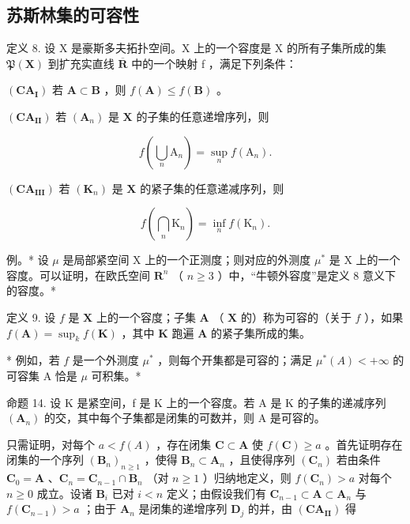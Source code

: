 \subsection{苏斯林集的可容性}

定义 8. 设 X 是豪斯多夫拓扑空间。X 上的一个容度是 X 的所有子集所成的集 \(\mathfrak{P}(\mathbf{X})\) 到扩充实直线 \(\overline{\mathbf{R}}\) 中的一个映射 f ，满足下列条件：

\((\mathbf{CA}_{\mathbf{I}})\) 若 \(\mathbf{A} \subset \mathbf{B}\) ，则 \(f(\mathbf{A}) \leqslant f(\mathbf{B})\) 。

\((\mathbf{CA}_{\mathbf{II}})\) 若 \((\mathbf{A}_n)\) 是 \(\mathbf{X}\) 的子集的任意递增序列，则

\[
f \left(\bigcup_ {n} \mathrm{A} _ {n}\right) = \sup _ {n} f (\mathrm{A} _ {n}).
\]

\((\mathbf{CA}_{\mathbf{III}})\) 若 \((\mathbf{K}_n)\) 是 \(\mathbf{X}\) 的紧子集的任意递减序列，则

\[
f \left(\bigcap_ {n} \mathrm{K} _ {n}\right) = \inf _ {n} f (\mathrm{K} _ {n}).
\]

例。* 设 \(\mu\) 是局部紧空间 X 上的一个正测度；则对应的外测度 \(\mu^{*}\) 是 X 上的一个容度。可以证明，在欧氏空间 \(\mathbf{R}^{n}\) （ \(n \geqslant 3\) ）中，“牛顿外容度”是定义 8 意义下的容度。*

定义 9. 设 \(f\) 是 \(\mathbf{X}\) 上的一个容度；子集 \(\mathbf{A}\) （ \(\mathbf{X}\) 的）称为可容的（关于 \(f\) ），如果 \(f(\mathbf{A}) = \sup_k f(\mathbf{K})\) ，其中 \(\mathbf{K}\) 跑遍 \(\mathbf{A}\) 的紧子集所成的集。

* 例如，若 \(f\) 是一个外测度 \(\mu^{*}\) ，则每个开集都是可容的；满足 \(\mu^{*}(A) < +\infty\) 的可容集 A 恰是 \(\mu\) 可积集。*

命题 14. 设 K 是紧空间，f 是 K 上的一个容度。若 A 是 K 的子集的递减序列 \((\mathbf{A}_{n})\) 的交，其中每个子集都是闭集的可数并，则 A 是可容的。

只需证明，对每个 \(a < f(A)\) ，存在闭集 \(\mathbf{C} \subset \mathbf{A}\) 使 \(f(\mathbf{C}) \geqslant a\) 。首先证明存在闭集的一个序列 \((\mathbf{B}_n)_{n \geqslant 1}\) ，使得 \(\mathbf{B}_n \subset \mathbf{A}_n\) ，且使得序列 \((\mathbf{C}_n)\) 若由条件 \(\mathbf{C}_0 = \mathbf{A}\) 、\(\mathbf{C}_n = \mathbf{C}_{n-1} \cap \mathbf{B}_n\) （对 \(n \geqslant 1\) ）归纳地定义，则 \(f(\mathbf{C}_n) > a\) 对每个 \(n \geqslant 0\) 成立。设诸 \(\mathbf{B}_i\) 已对 \(i < n\) 定义；由假设我们有 \(\mathbf{C}_{n-1} \subset \mathbf{A} \subset \mathbf{A}_n\) 与 \(f(\mathbf{C}_{n-1}) > a\) ；由于 \(\mathbf{A}_n\) 是闭集的递增序列 \(\mathbf{D}_j\) 的并，由 \((\mathbf{CA}_{\mathbf{II}})\) 得


